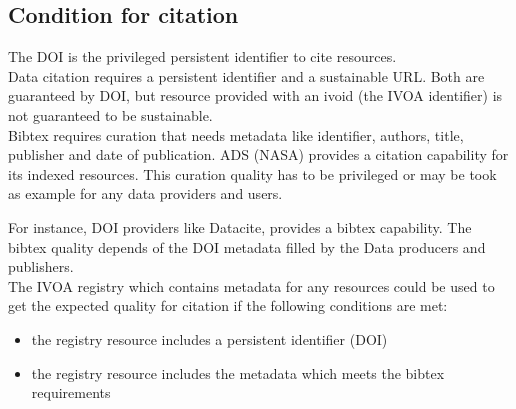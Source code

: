 \documentclass[11pt,a4paper]{ivoa}
\begin{document}
\subsection{Condition for citation}

The DOI is the privileged persistent identifier to cite resources.\\

Data citation requires a persistent identifier and a sustainable URL. 
Both are guaranteed by DOI, but resource provided with an ivoid (the IVOA identifier) 
is not guaranteed to be sustainable.\\

Bibtex requires curation that needs metadata like identifier, authors, title, publisher and date of publication.
ADS (NASA) provides a citation capability for its indexed resources. This curation quality has to be privileged or may be took as example for any data providers and users.

For instance, DOI providers like Datacite, provides a bibtex capability. The bibtex quality depends of the DOI metadata filled by the Data producers and publishers.\\

The IVOA registry which contains metadata for any resources could be used to get the expected quality for citation if the following conditions are met:
\begin{itemize}
\item the registry resource includes a persistent identifier (DOI)
\item the registry resource includes the metadata which meets the bibtex requirements
\end{itemize}
\end{document}
